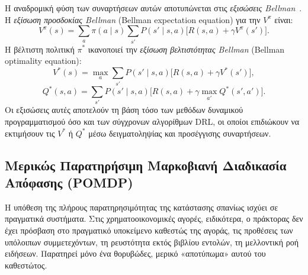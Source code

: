 Η αναδρομική φύση των συναρτήσεων αυτών αποτυπώνεται στις \emph{εξισώσεις
Bellman}~\cite{bellman1957}. Η \emph{εξίσωση προσδοκίας Bellman}
(Bellman expectation equation) για την $V^{\pi}$
είναι:
\begin{equation}
    V^{\pi}(s) = \sum_{a} \pi(a \mid s)
    \sum_{s'} P(s' \mid s, a)
    \big[ R(s, a) + \gamma V^{\pi}(s') \big].
    \label{eq:bellman-exp}
\end{equation}
Η βέλτιστη πολιτική $\pi^{*}$ ικανοποιεί την \emph{εξίσωση βελτιστότητας
Bellman} (Bellman optimality equation):
\begin{equation}
    V^{*}(s) = \max_{a} \sum_{s'} P(s' \mid s, a)
    \big[ R(s, a) + \gamma V^{*}(s') \big],
    \label{eq:bellman-opt-v}
\end{equation}
\begin{equation}
    Q^{*}(s, a) = \sum_{s'} P(s' \mid s, a)
    \Big[ R(s, a) + \gamma \max_{a'} Q^{*}(s', a') \Big].
    \label{eq:bellman-opt-q}
\end{equation}
Οι εξισώσεις αυτές αποτελούν τη βάση τόσο των μεθόδων δυναμικού προγραμματισμού
όσο και των σύγχρονων αλγορίθμων DRL, οι οποίοι επιδιώκουν να εκτιμήσουν τις
$V^{*}$ ή $Q^{*}$ μέσω δειγματοληψίας και προσέγγισης συναρτήσεων.


\subsection{Μερικώς Παρατηρήσιμη Μαρκοβιανή Διαδικασία Απόφασης (POMDP)}
\label{subsec:pomdp}

Η υπόθεση της πλήρους παρατηρησιμότητας της κατάστασης σπανίως ισχύει σε
πραγματικά συστήματα. Στις χρηματοοικονομικές αγορές, ειδικότερα, ο πράκτορας
δεν έχει πρόσβαση στο πραγματικό υποκείμενο καθεστώς
της αγοράς, τις προθέσεις των υπόλοιπων
συμμετεχόντων, τη ρευστότητα εκτός βιβλίου εντολών, τη μελλοντική ροή ειδήσεων.
Παρατηρεί μόνο ένα θορυβώδες, μερικό «αποτύπωμα» αυτού του καθεστώτος.

